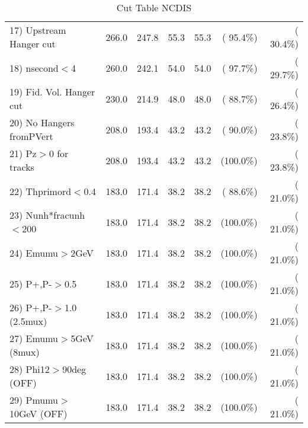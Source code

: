 \begin{table}[h!]
\begin{tabular}{||l||r|r|r|r|r|r||}
 17) Upstream Hanger cut  &        266.0 &        247.8 &         55.3 &         55.3 & ( 95.4\%) & ( 30.4\%) \\
 18) nsecond$<$4          &        260.0 &        242.1 &         54.0 &         54.0 & ( 97.7\%) & ( 29.7\%) \\
 19) Fid. Vol. Hanger cut &        230.0 &        214.9 &         48.0 &         48.0 & ( 88.7\%) & ( 26.4\%) \\
 20) No Hangers fromPVert &        208.0 &        193.4 &         43.2 &         43.2 & ( 90.0\%) & ( 23.8\%) \\
 21) Pz$>$0 for tracks    &        208.0 &        193.4 &         43.2 &         43.2 & (100.0\%) & ( 23.8\%) \\
 22) Thprimord$<$0.4      &        183.0 &        171.4 &         38.2 &         38.2 & ( 88.6\%) & ( 21.0\%) \\
 23) Nunh*fracunh$<$200   &        183.0 &        171.4 &         38.2 &         38.2 & (100.0\%) & ( 21.0\%) \\
 24) Emumu$>$2GeV         &        183.0 &        171.4 &         38.2 &         38.2 & (100.0\%) & ( 21.0\%) \\
 25) P+,P-$>$0.5          &        183.0 &        171.4 &         38.2 &         38.2 & (100.0\%) & ( 21.0\%) \\
 26) P+,P-$>$1.0 (2.5mux) &        183.0 &        171.4 &         38.2 &         38.2 & (100.0\%) & ( 21.0\%) \\
 27) Emumu$>$5GeV  (8mux) &        183.0 &        171.4 &         38.2 &         38.2 & (100.0\%) & ( 21.0\%) \\
 28) Phi12$>$90deg  (OFF) &        183.0 &        171.4 &         38.2 &         38.2 & (100.0\%) & ( 21.0\%) \\
 29) Pmumu$>$10GeV  (OFF) &        183.0 &        171.4 &         38.2 &         38.2 & (100.0\%) & ( 21.0\%) \\
 \hline
 \hline
 \end{tabular}
 \caption{Cut Table  NCDIS    }
 \label{tab-cutcohjpsi-mumu_ncdis}
 \end{table}
